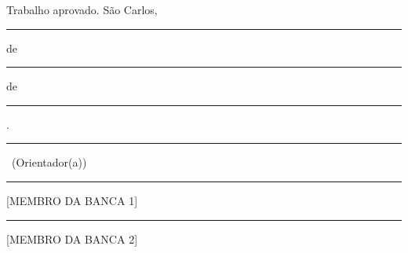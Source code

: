 \documentclass[
12pt,
openright,
twoside,
a4paper,
chapter=TITLE,
english,
brazil
]{uspsc/USPSC-classe/USPSC}
\begin{document}
\pretextual
\imprimircapa

\imprimirfolhaderosto*

%   


\begin{folhadeaprovacao}
\begin{center}
{\ABNTEXchapterfont\large\imprimirautor}

\vspace*{\fill}\vspace*{1.2cm}
\begin{minipage}[t]{\textwidth}
\centering
\ABNTEXchapterfont\bfseries\large\imprimirtitulo
\end{minipage}
\vspace*{1.2cm}

\hspace{.45\textwidth}
\begin{minipage}{.5\textwidth}
\imprimirpreambulo
\end{minipage}
\vspace*{1.2cm}

\end{center}

Trabalho aprovado. São Carlos, \rule[-0.2cm]{2.5cm}{0.15mm} de
\rule[-0.2cm]{4cm}{0.15mm} de \rule[-0.2cm]{1.5cm}{0.15mm}.

\vspace{1.0cm}
\begin{center}
\rule{9cm}{0.15mm}\par
\imprimirorientador\ (Orientador(a))

\vspace{1.0cm}
\rule{9cm}{0.15mm}\par
{}[MEMBRO DA BANCA 1]

\vspace{1.0cm}
\rule{9cm}{0.15mm}\par
{}[MEMBRO DA BANCA 2]
\end{center}
\vspace*{\fill}
\end{folhadeaprovacao}




\end{document}
